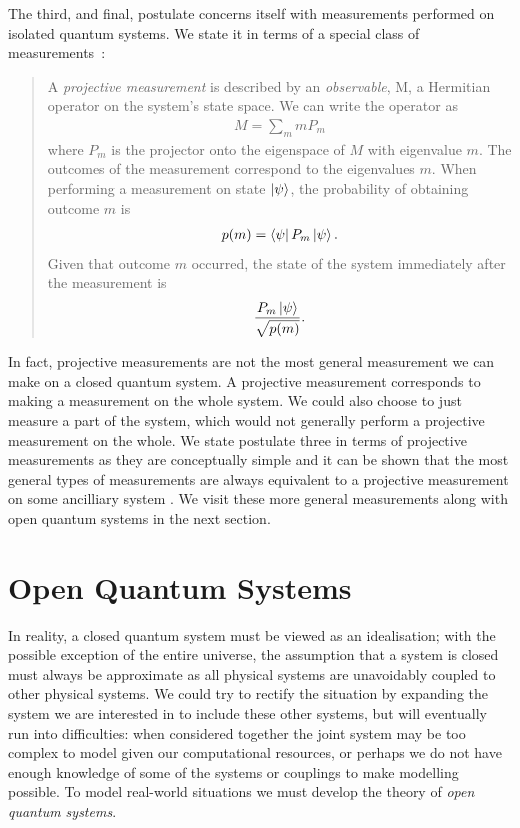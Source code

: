 The third, and final, postulate concerns itself with measurements performed on isolated quantum systems. We state it in terms of a special class of measurements~\cite{nielsen+chuang}:
\begin{quotation}
  A \textit{projective measurement} is described by an \textit{observable}, M, a Hermitian operator on the system's state space. We can write the operator as
  \begin{align}
    M = \sum_m mP_m
  \end{align}
  where $P_m$ is the projector onto the eigenspace of $M$ with eigenvalue $m$. The outcomes of the measurement correspond to the eigenvalues $m$. When performing a measurement on state $\left\vert\psi\right\rangle$, the probability of obtaining outcome $m$ is
  \begin{align}
    p(m) = \left\langle \psi\right\vert P_m\left\vert\psi\right\rangle.
  \end{align}
  Given that outcome $m$ occurred, the state of the system immediately after the measurement is
  \begin{align}
    \frac{P_m\left\vert\psi\right\rangle}{\sqrt{p(m)}}.
  \end{align}
\end{quotation}
In fact, projective measurements are not the most general measurement we can make on a closed quantum system. A projective measurement corresponds to making a measurement on the whole system. We could also choose to just measure a part of the system, which would not generally perform a projective measurement on the whole. We state postulate three in terms of projective measurements as they are conceptually simple and it can be shown that the most general types of measurements are always equivalent to a projective measurement on some ancilliary system \cite{peres}. We visit these more general measurements along with open quantum systems in the next section.


\section{Open Quantum Systems}

In reality, a closed quantum system must be viewed as an idealisation; with the possible exception of the entire universe, the assumption that a system is closed must always be approximate as all physical systems are unavoidably coupled to other physical systems. We could try to rectify the situation by expanding the system we are interested in to include these other systems, but will eventually run into difficulties: when considered together the joint system may be too complex to model given our computational resources, or perhaps we do not have enough knowledge of some of the systems or couplings to make modelling possible. To model real-world situations we must develop the theory of \textit{open quantum systems}. 


